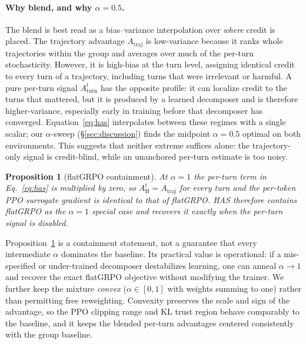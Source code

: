 \documentclass{article}
\newtheorem{proposition}{Proposition}
\newcommand{\Atraj}{A_{\text{traj}}}
\newcommand{\Aturn}{A_{\text{turn}}}
\newcommand{\AH}{A_{\text{H}}}
\begin{document}
\paragraph{Why blend, and why $\alpha{=}0.5$.}
The blend is best read as a bias--variance interpolation over \emph{where} credit is placed.
The trajectory advantage $\Atraj$ is low-variance because it ranks whole trajectories within
the group and averages over much of the per-turn stochasticity. However, it is high-bias at
the turn level, assigning identical credit to every turn of a trajectory, including turns that
were irrelevant or harmful. A pure per-turn signal $\Aturn^{t}$ has the opposite profile: it
can localize credit to the turns that mattered, but it is produced by a learned decomposer and
is therefore higher-variance, especially early in training before that decomposer has
converged. Equation~\eqref{eq:has} interpolates between these regimes with a single scalar;
our $\alpha$-sweep (\S\ref{sec:discussion}) finds the midpoint $\alpha{=}0.5$ optimal on both
environments. This suggests that neither extreme suffices alone: the trajectory-only signal is
credit-blind, while an unanchored per-turn estimate is too noisy.

\begin{proposition}[flatGRPO containment]
\label{prop:safe}
At $\alpha{=}1$ the per-turn term in Eq.~\eqref{eq:has} is multiplied by zero, so
$\AH^{t}=\Atraj$ for every turn and the per-token PPO surrogate gradient is \emph{identical}
to that of flatGRPO. HAS therefore contains flatGRPO as the $\alpha{=}1$ special case and
recovers it exactly when the per-turn signal is disabled.
\end{proposition}
\noindent Proposition~\ref{prop:safe} is a containment statement, not a guarantee that every
intermediate $\alpha$ dominates the baseline. Its practical value is operational: if a
mis-specified or under-trained decomposer destabilizes learning, one can anneal
$\alpha{\to}1$ and recover the exact flatGRPO objective without modifying the trainer. We
further keep the mixture \emph{convex} ($\alpha\in[0,1]$ with weights summing to one) rather
than permitting free reweighting. Convexity preserves the scale and sign of the advantage, so
the PPO clipping range and KL trust region behave comparably to the baseline, and it keeps the
blended per-turn advantages centered consistently with the group baseline.
\end{document}
